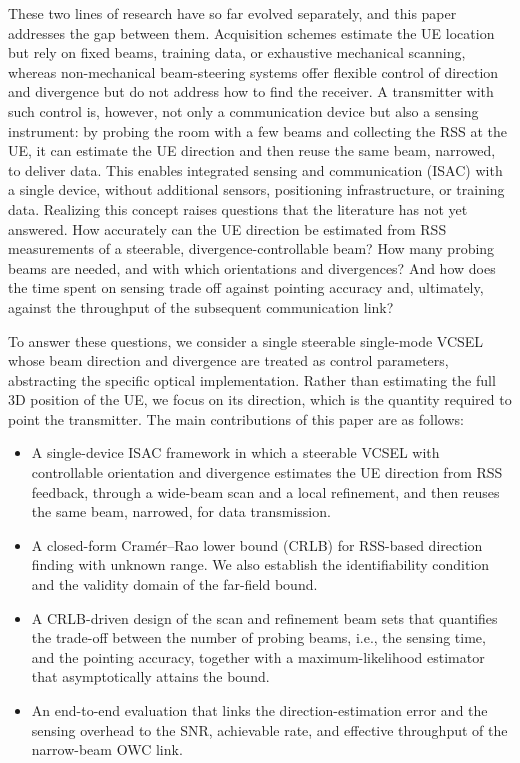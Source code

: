 \documentclass[journal]{IEEEtran}
\begin{document}
These two lines of research have so far evolved separately, and this
paper addresses the gap between them. Acquisition schemes estimate the UE
location but rely on fixed beams, training data, or exhaustive mechanical
scanning, whereas non-mechanical beam-steering systems offer flexible
control of direction and divergence but do not address how to find the
receiver. A transmitter with such control is, however, not only a
communication device but also a sensing instrument: by probing the room
with a few beams and collecting the RSS at the UE, it can estimate the UE
direction and then reuse the same beam, narrowed, to deliver data. This
enables integrated sensing and communication (ISAC) with a single device,
without additional sensors, positioning infrastructure, or training data.
Realizing this concept raises questions that the literature has not yet
answered. How accurately can the UE direction be estimated from RSS
measurements of a steerable, divergence-controllable beam? How many
probing beams are needed, and with which orientations and divergences?
And how does the time spent on sensing trade off against pointing
accuracy and, ultimately, against the throughput of the subsequent
communication link?

To answer these questions, we consider a single steerable single-mode
VCSEL whose beam direction and divergence are treated as control
parameters, abstracting the specific optical implementation. Rather than
estimating the full 3D position of the UE, we focus on its direction,
which is the quantity required to point the transmitter. The main
contributions of this paper are as follows:
\begin{itemize}
  \item A single-device ISAC framework in which a steerable VCSEL with
  controllable orientation and divergence estimates the UE direction
  from RSS feedback, through a wide-beam scan and a local refinement,
  and then reuses the same beam, narrowed, for data transmission.
  \item A closed-form Cram\'er--Rao lower bound (CRLB) for RSS-based
  direction finding with unknown range. %
  We also establish the identifiability condition and
  the validity domain of the far-field bound.
  \item A CRLB-driven design of the scan and refinement beam sets that
  quantifies the trade-off between the number of probing beams, i.e.,
  the sensing time, and the pointing accuracy, together with a
  maximum-likelihood estimator that asymptotically attains the bound.
  \item An end-to-end evaluation that links the direction-estimation
  error and the sensing overhead to the SNR, achievable rate, and
  effective throughput of the narrow-beam OWC link.
\end{itemize}
\end{document}
